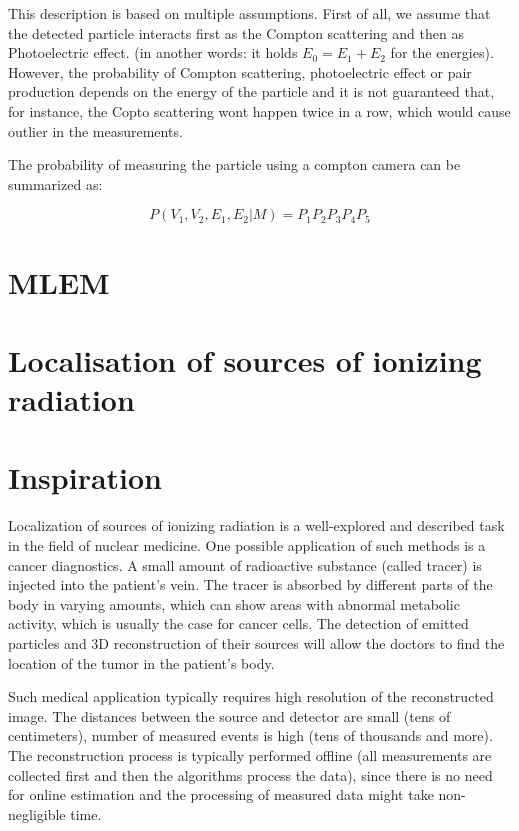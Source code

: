 This description is based on multiple assumptions.
First of all, we assume that the detected particle interacts first as the Compton scattering and then as Photoelectric effect. 
(in another words: it holds $E_{0} = E_{1} + E_{2}$ for the energies).
However, the probability of Compton scattering, photoelectric effect or pair production depends on the energy of the particle and it is not guaranteed that, for instance, the Copto scattering wont happen twice in a row, which would cause outlier in the measurements.

The probability of measuring the particle using a compton camera can be summarized as:

\begin{equation}
P(V_{1}, V_{2}, E_{1}, E_{2}|M) = P_{1}P_{2}P_{3}P_{4}P_{5} 
\end{equation}


\section{MLEM}



\section{Localisation of sources of ionizing radiation}
\section{Inspiration}
Localization of sources of ionizing radiation is a well-explored and described task in the field of nuclear medicine.
One possible application of such methods is a cancer diagnostics.
A small amount of radioactive substance (called tracer) is injected into the patient's vein.
The tracer is absorbed by different parts of the body in varying amounts, which can show areas with abnormal metabolic activity, which is usually the case for cancer cells.
The detection of emitted particles and 3D reconstruction of their sources will allow the doctors to find the location of the tumor in the patient's body.

Such medical application typically requires high resolution of the reconstructed image.
The distances between the source and detector are small (tens of centimeters), number of measured events is high (tens of thousands and more).
The reconstruction process is typically performed offline (all measurements are collected first and then the algorithms process the data), since there is no need for online estimation and the processing of measured data might take non-negligible time.

